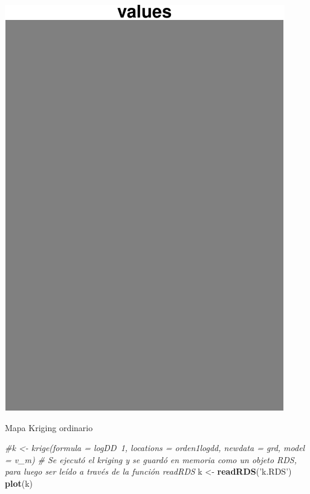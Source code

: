 \documentclass[11pt,]{article}
\newenvironment{Shaded}{\begin{snugshade}}{\end{snugshade}}
\newcommand{\KeywordTok}[1]{\textcolor[rgb]{0.13,0.29,0.53}{\textbf{#1}}}
\newcommand{\StringTok}[1]{\textcolor[rgb]{0.31,0.60,0.02}{#1}}
\newcommand{\CommentTok}[1]{\textcolor[rgb]{0.56,0.35,0.01}{\textit{#1}}}
\newcommand{\NormalTok}[1]{#1}
\begin{document}
\includegraphics{proyecto_f_files/figure-latex/unnamed-chunk-97-1.pdf}

Mapa Kriging ordinario

\begin{Shaded}
\begin{Highlighting}[]
\CommentTok{#k <- krige(formula = logDD~1, locations = orden1logdd, newdata = grd, model = v_m)}
\CommentTok{# Se ejecutó el kriging y se guardó en memoria como un objeto RDS, para luego ser leído a través de la función readRDS}
\NormalTok{k <-}\StringTok{ }\KeywordTok{readRDS}\NormalTok{(}\StringTok{'k.RDS'}\NormalTok{)}
\KeywordTok{plot}\NormalTok{(k)}
\end{Highlighting}
\end{Shaded}
\end{document}
